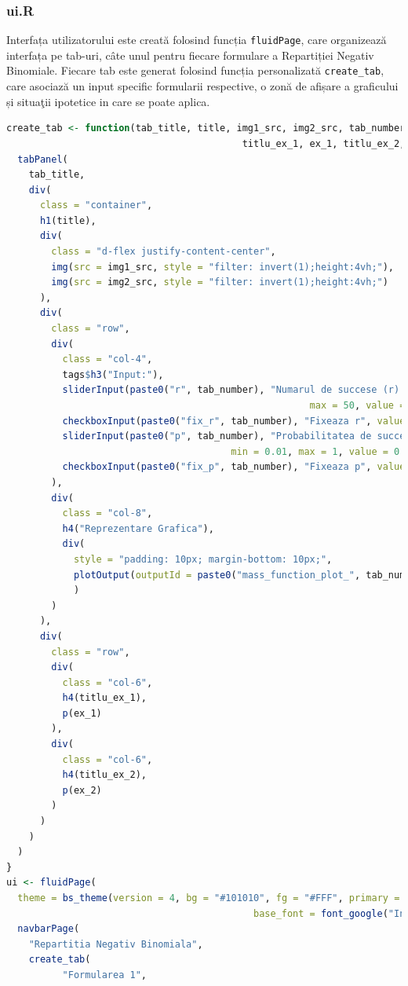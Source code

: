 \documentclass[a4paper,11pt]{article}
\begin{document}
\subsubsection*{ui.R}

Interfața utilizatorului este creată folosind funcția \texttt{fluidPage}, care organizează interfața pe tab-uri, câte unul pentru fiecare formulare a Repartiției Negativ Binomiale. Fiecare tab este generat folosind funcția personalizată \texttt{create\_tab}, care asociază un input specific formularii respective, o zonă de afișare a graficului și situa\c{t}ii ipotetice in care se poate aplica.

\begin{lstlisting}[language=R]
  create_tab <- function(tab_title, title, img1_src, img2_src, tab_number, 
                                          titlu_ex_1, ex_1, titlu_ex_2, ex_2) {
  tabPanel(
    tab_title,
    div(
      class = "container",
      h1(title),
      div(
        class = "d-flex justify-content-center",
        img(src = img1_src, style = "filter: invert(1);height:4vh;"),
        img(src = img2_src, style = "filter: invert(1);height:4vh;")
      ),
      div(
        class = "row",
        div(
          class = "col-4",
          tags$h3("Input:"),
          sliderInput(paste0("r", tab_number), "Numarul de succese (r):", min = 1, 
                                                      max = 50, value = 10, step = 1),
          checkboxInput(paste0("fix_r", tab_number), "Fixeaza r", value = TRUE),
          sliderInput(paste0("p", tab_number), "Probabilitatea de succes (p):", 
                                        min = 0.01, max = 1, value = 0.5, step = 0.01),
          checkboxInput(paste0("fix_p", tab_number), "Fixeaza p", value = FALSE)
        ),
        div(
          class = "col-8",
          h4("Reprezentare Grafica"),
          div(
            style = "padding: 10px; margin-bottom: 10px;",
            plotOutput(outputId = paste0("mass_function_plot_", tab_number)),
            )
        )
      ),
      div(
        class = "row",
        div(
          class = "col-6",
          h4(titlu_ex_1),
          p(ex_1)
        ),
        div(
          class = "col-6",
          h4(titlu_ex_2),
          p(ex_2)
        )
      )
    )
  )
}
ui <- fluidPage(
  theme = bs_theme(version = 4, bg = "#101010", fg = "#FFF", primary = "#E69F00", 
                                            base_font = font_google("Inconsolata")),
  navbarPage(
    "Repartitia Negativ Binomiala",
    create_tab(
          "Formularea 1",

\end{lstlisting}
\end{document}
